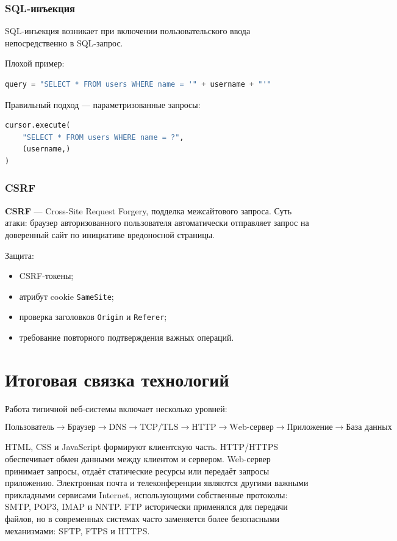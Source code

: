 \documentclass[12pt,a4paper]{article}
\begin{document}
\subsubsection{SQL-инъекция}

SQL-инъекция возникает при включении пользовательского ввода непосредственно в SQL-запрос.

Плохой пример:
\begin{lstlisting}[language=Python]
query = "SELECT * FROM users WHERE name = '" + username + "'"
\end{lstlisting}

Правильный подход --- параметризованные запросы:
\begin{lstlisting}[language=Python]
cursor.execute(
    "SELECT * FROM users WHERE name = ?",
    (username,)
)
\end{lstlisting}

\subsubsection{CSRF}

\textbf{CSRF} --- Cross-Site Request Forgery, подделка межсайтового запроса. Суть атаки: браузер авторизованного пользователя автоматически отправляет запрос на доверенный сайт по инициативе вредоносной страницы.

Защита:
\begin{itemize}
    \item CSRF-токены;
    \item атрибут cookie \texttt{SameSite};
    \item проверка заголовков \texttt{Origin} и \texttt{Referer};
    \item требование повторного подтверждения важных операций.
\end{itemize}

\section{Итоговая связка технологий}

Работа типичной веб-системы включает несколько уровней:

\[
\text{Пользователь}
\rightarrow
\text{Браузер}
\rightarrow
\text{DNS}
\rightarrow
\text{TCP/TLS}
\rightarrow
\text{HTTP}
\rightarrow
\text{Web-сервер}
\rightarrow
\text{Приложение}
\rightarrow
\text{База данных}
\]

HTML, CSS и JavaScript формируют клиентскую часть. HTTP/HTTPS обеспечивает обмен данными между клиентом и сервером. Web-сервер принимает запросы, отдаёт статические ресурсы или передаёт запросы приложению. Электронная почта и телеконференции являются другими важными прикладными сервисами Internet, использующими собственные протоколы: SMTP, POP3, IMAP и NNTP. FTP исторически применялся для передачи файлов, но в современных системах часто заменяется более безопасными механизмами: SFTP, FTPS и HTTPS.
\end{document}
